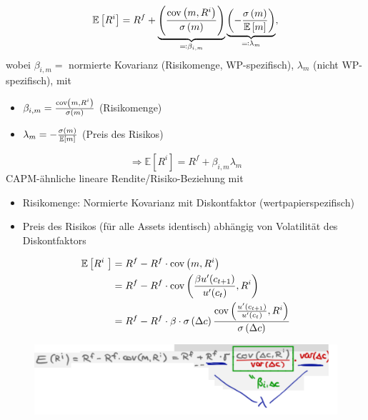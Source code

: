 \documentclass[12pt]{extreport} %
\theoremstyle{named}
\theoremstyle{nnamed}
\theoremstyle{itshape}
\theoremstyle{normal}
\begin{document}
	$$ \mathbb{E}\left[ R^i \right] = R^f + \underbrace{\left( \frac{\operatorname{cov} \left( m, R^i \right)}{\sigma \left( m \right)} \right)}_{\eqqcolon \beta_{i,m}} \underbrace{\left( - \frac{\sigma \left( m \right)}{\mathbb{E} \left[ m \right]} \right)}_{\eqqcolon \lambda_{m}},  $$
wobei $\beta_{i,m} =$ normierte Kovarianz (Risikomenge, WP-spezifisch), $\lambda_m$ (nicht WP-spezifisch), mit
\begin{itemize}
	\item $\beta_{i,m} = \frac{\operatorname{cov} \left( m, R^i \right)}{\sigma \left( m \right)}$ (Risikomenge)
	\item $\lambda_m = - \frac{\sigma \left( m \right)}{\mathbb{E} \left[ m \right]}$ (Preis des Risikos)
\end{itemize}
$$ \Rightarrow \mathbb{E} \left[ R^i \right] = R^f + \beta_{i, m} \lambda_m $$
CAPM-ähnliche lineare Rendite/Risiko-Beziehung mit
\begin{itemize}
	\item Risikomenge: Normierte Kovarianz mit Diskontfaktor (wertpapierspezifisch)
	\item Preis des Risikos (für alle Assets identisch) abhängig von Volatilität des Diskontfaktors
\end{itemize}


\begin{align*}
	\mathbb{E} \left[ R^i \right] & = R^f  - R^f \cdot \cov \left( m, R^i \right) \\
	& = R^f  - R^f \cdot \cov \left( \frac{\beta u'(c_{t+1})}{u'(c_t)}, R^i \right) \\
	& = R^f  - R^f \cdot \beta  \cdot \var \left( \Delta c \right) \frac{\cov \left( \frac{u'(c_{t+1})}{u'(c_t)}, R^i \right)}{ \var \left( \Delta c \right)} \\	
\end{align*}

\begin{figure}[h!] \centering
	\includegraphics[scale=0.4]{img/p47-1}
\end{figure}
\end{document}
